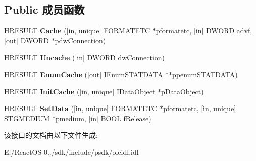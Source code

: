 \subsection*{Public 成员函数}
\begin{DoxyCompactItemize}
\item 
\mbox{\label{interface_i_ole_cache_a3d1d1e67de83eaad16ac54c2dc7ceefd}} 
H\+R\+E\+S\+U\+LT {\bfseries Cache} (\mbox{[}in, \hyperlink{interfaceunique}{unique}\mbox{]} F\+O\+R\+M\+A\+T\+E\+TC $\ast$pformatetc, \mbox{[}in\mbox{]} D\+W\+O\+RD advf, \mbox{[}out\mbox{]} D\+W\+O\+RD $\ast$pdw\+Connection)
\item 
\mbox{\label{interface_i_ole_cache_ad2ff8491ec2c010e43c85bfd9026a24c}} 
H\+R\+E\+S\+U\+LT {\bfseries Uncache} (\mbox{[}in\mbox{]} D\+W\+O\+RD dw\+Connection)
\item 
\mbox{\label{interface_i_ole_cache_af78ecd9d81c0d126896732f5cbe3c30d}} 
H\+R\+E\+S\+U\+LT {\bfseries Enum\+Cache} (\mbox{[}out\mbox{]} \hyperlink{interface_i_enum_s_t_a_t_d_a_t_a}{I\+Enum\+S\+T\+A\+T\+D\+A\+TA} $\ast$$\ast$ppenum\+S\+T\+A\+T\+D\+A\+TA)
\item 
\mbox{\label{interface_i_ole_cache_a7552b6140346a3e5be3f389c05e61ce3}} 
H\+R\+E\+S\+U\+LT {\bfseries Init\+Cache} (\mbox{[}in, \hyperlink{interfaceunique}{unique}\mbox{]} \hyperlink{interface_i_data_object}{I\+Data\+Object} $\ast$p\+Data\+Object)
\item 
\mbox{\label{interface_i_ole_cache_acb574701f88027fa83f5dd213f9c6b4b}} 
H\+R\+E\+S\+U\+LT {\bfseries Set\+Data} (\mbox{[}in, \hyperlink{interfaceunique}{unique}\mbox{]} F\+O\+R\+M\+A\+T\+E\+TC $\ast$pformatetc, \mbox{[}in, \hyperlink{interfaceunique}{unique}\mbox{]} S\+T\+G\+M\+E\+D\+I\+UM $\ast$pmedium, \mbox{[}in\mbox{]} B\+O\+OL f\+Release)
\end{DoxyCompactItemize}


该接口的文档由以下文件生成\+:\begin{DoxyCompactItemize}
\item 
E\+:/\+React\+O\+S-\/0../sdk/include/psdk/oleidl.\+idl\end{DoxyCompactItemize}
